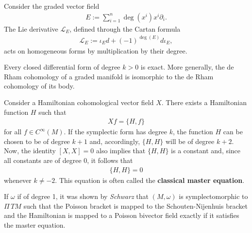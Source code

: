 
    \begin{property}
        Consider the graded vector field
        \begin{gather}
            E := \sum_{i=1}^n\deg(x^i)x^i\partial_i.
        \end{gather}
        The Lie derivative $\mathcal{L}_E$, defined through the Cartan formula
        \begin{gather}
            \mathcal{L}_E := \iota_Ed + (-1)^{\deg(E)}d\iota_E,
        \end{gather}
        acts on homogeneous forms by multiplication by their degree.
    \end{property}
    \begin{property}
        Every closed differential form of degree $k>0$ is exact. More generally, the de Rham cohomology of a graded manifold is isomorphic to the de Rham cohomology of its body.
    \end{property}
    \begin{result}
        Consider a Hamiltonian cohomological vector field $X$. There exists a Hamiltonian function $H$ such that
        \begin{gather}
            Xf = \{H,f\}
        \end{gather}
        for all $f\in C^\infty(M)$. If the symplectic form has degree $k$, the function $H$ can be chosen to be of degree $k+1$ and, accordingly, $\{H,H\}$ will be of degree $k+2$. Now, the identity $[X,X] = 0$ also implies that $\{H,H\}$ is a constant and, since all constants are of degree 0, it follows that
        \begin{gather}
            \label{hdg:classical_master_equation}
            \{H,H\}=0
        \end{gather}
        whenever $k\neq-2$. This equation is often called the \textbf{classical master equation}.

        If $\omega$ if of degree 1, it was shown by \textit{Schwarz} that $(M,\omega)$ is symplectomorphic to $\Pi\,TM$ such that the Poisson bracket is mapped to the Schouten-Nijenhuis bracket and the Hamiltonian is mapped to a Poisson bivector field exactly if it satisfies the master equation.
    \end{result}


